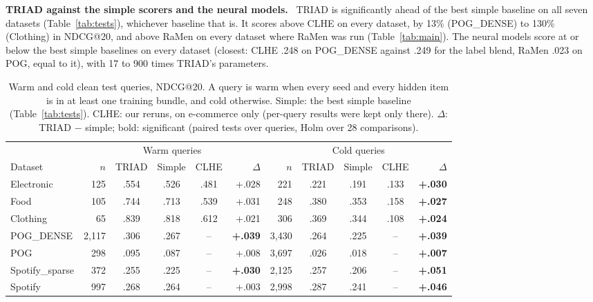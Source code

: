 \documentclass[runningheads]{llncs}
\renewcommand{\paragraph}[1]{\smallskip\noindent\textbf{#1}\ }
\begin{document}
\paragraph{TRIAD against the simple scorers and the neural models.} TRIAD is significantly ahead of the best simple
baseline on all seven datasets (Table~\ref{tab:tests}), whichever baseline that is. It scores above CLHE on every dataset, by 13\% (POG\_DENSE) to 130\%
(Clothing) in NDCG@20, and above RaMen on every dataset where RaMen was run (Table~\ref{tab:main}). The neural
models score at or below the best simple baselines on every dataset (closest: CLHE .248 on POG\_DENSE against .249
for the label blend, RaMen .023 on POG, equal to it), with 17 to 900 times TRIAD's parameters.

\begin{table}[t]
\centering
\caption{Warm and cold clean test queries, NDCG@20. A query is warm when every seed and every hidden item is in at
least one training bundle, and cold otherwise. Simple: the best simple baseline (Table~\ref{tab:tests}). CLHE: our
reruns, on e-commerce only (per-query results were kept only there). $\Delta$: TRIAD $-$ simple; bold: significant
(paired tests over queries, Holm over 28 comparisons).}
\label{tab:cold}
\setlength{\tabcolsep}{2.6pt}
\scriptsize
\begin{tabular}{lrcccrrcccr}
\toprule
 & \multicolumn{5}{c}{Warm queries} & \multicolumn{5}{c}{Cold queries}\\
\cmidrule(lr){2-6}\cmidrule(lr){7-11}
Dataset & $n$ & TRIAD & Simple & CLHE & $\Delta$ & $n$ & TRIAD & Simple & CLHE & $\Delta$\\
\midrule
Electronic & 125 & .554 & .526 & .481 & +.028 & 221 & .221 & .191 & .133 & \textbf{+.030}\\
Food & 105 & .744 & .713 & .539 & +.031 & 248 & .380 & .353 & .158 & \textbf{+.027}\\
Clothing & 65 & .839 & .818 & .612 & +.021 & 306 & .369 & .344 & .108 & \textbf{+.024}\\
POG\_DENSE & 2,117 & .306 & .267 & -- & \textbf{+.039} & 3,430 & .264 & .225 & -- & \textbf{+.039}\\
POG & 298 & .095 & .087 & -- & +.008 & 3,697 & .026 & .018 & -- & \textbf{+.007}\\
Spotify\_sparse & 372 & .255 & .225 & -- & \textbf{+.030} & 2,125 & .257 & .206 & -- & \textbf{+.051}\\
Spotify & 997 & .268 & .264 & -- & +.003 & 2,998 & .287 & .241 & -- & \textbf{+.046}\\
\bottomrule
\end{tabular}
\end{table}
\end{document}
